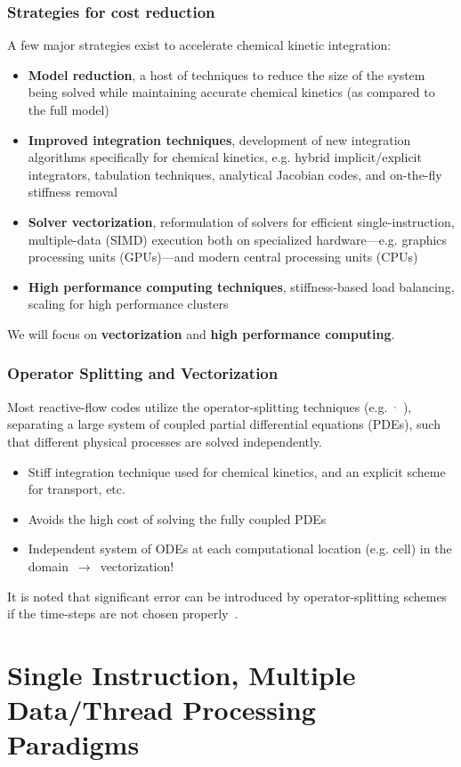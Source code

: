 \documentclass{beamer}
\begin{document}
\begin{frame}
 \frametitle{Strategies for cost reduction}
 A few major strategies exist to accelerate chemical kinetic integration:
 \begin{itemize}
  \item \textbf{Model reduction}, a host of techniques to reduce the size of the system being solved while maintaining accurate chemical kinetics (as compared to the full model)
  \item \textbf{Improved integration techniques}, development of new integration algorithms specifically for chemical kinetics, e.g. hybrid implicit\slash explicit integrators, tabulation techniques, analytical Jacobian codes, and on-the-fly stiffness removal
  \item \textbf{Solver vectorization}, reformulation of solvers for efficient single-instruction, multiple-data (SIMD) execution both on specialized hardware---e.g. graphics processing units (GPUs)---and modern central processing units (CPUs)
  \item \textbf{High performance computing techniques}, stiffness-based load balancing, scaling for high performance clusters
 \end{itemize}
 We will focus on \textbf{vectorization} and \textbf{high performance computing}.
\end{frame}

\begin{frame}
 \frametitle{Operator Splitting and Vectorization}
 Most reactive-flow codes utilize the operator-splitting techniques (e.g.~$^{,}$~), separating a large system of coupled partial differential equations (PDEs), such that different physical processes are solved independently.
 \begin{itemize}
  \item Stiff integration technique used for chemical kinetics, and an explicit scheme for transport, etc.
  \item Avoids the high cost of solving the fully coupled PDEs
  \item Independent system of ODEs at each computational location (e.g. cell) in the domain~$\rightarrow$~vectorization!
 \end{itemize}
 It is noted that significant error can be introduced by operator-splitting schemes if the time-steps are not chosen properly~.
\end{frame}

\section{Single Instruction, Multiple Data\slash Thread Processing Paradigms}
\end{document}
